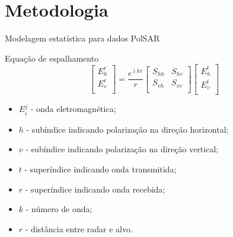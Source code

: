 \documentclass[10pt]{beamer}
\begin{document}
\section{Metodologia}
\begin{frame}{Modelagem estatística para dados PolSAR}
	
\begin{alertblock}{Equação de espalhamento}
\begin{equation}
 \left[
\begin{array}{c}
	E_{h}^{r}   \\
	E_{v}^{r}    \\
\end{array}
\right]
 = \frac{e^{\hat{\imath} kr}}{r}\left[
\begin{array}{cc}
	S_{hh}   & S_{hv}   \\
	S_{vh}   & S_{vv}   \\
\end{array}
\right]
 \left[
\begin{array}{c}
	E_{h}^{t}   \\
	E_{v}^{t}    \\
\end{array}
\right]
\end{equation}
\end{alertblock}
\begin{itemize}
	\item \alert{ $E_{i}^{j}$ - onda eletromagnética;}
	\item \alert{ $h$ - subíndice indicando polarização na direção horizontal;}
	\item \alert{ $v$ - subíndice indicando polarização na direção vertical;}
	\item \alert{ $t$ - superíndice indicando onda transmitida;}
	\item \alert{ $r$ - superíndice indicando onda recebida;}
	\item \alert{ $k$ - número de onda;}
	\item \alert{ $r$ - distância entre radar e alvo.}
\end{itemize}
\end{frame}
\end{document}
